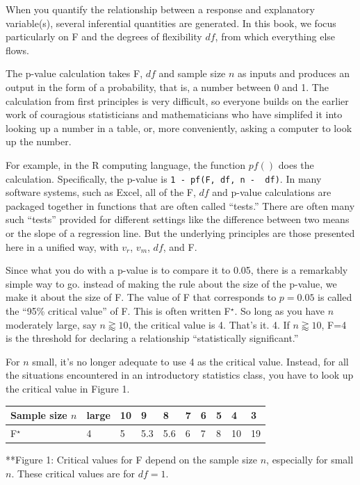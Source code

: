 \documentclass[]{tufte-book}
\begin{document}
When you quantify the relationship between a response and explanatory variable(s), several inferential quantities are generated. In this book, we focus particularly on F and the degrees of flexibility \(df\), from which everything else flows.

The p-value calculation takes F, \(df\) and sample size \(n\) as inputs and produces an output in the form of a probability, that is, a number between 0 and 1. The calculation from first principles is very difficult, so everyone builds on the earlier work of couragious statisticians and mathematicians who have simplifed it into looking up a number in a table, or, more conveniently, asking a computer to look up the number.

For example, in the R computing language, the function \(pf()\) does the calculation. Specifically, the p-value is \texttt{1\ -\ pf(F,\ df,\ n\ -\ \ df)}. In many software systems, such as Excel, all of the F, \(df\) and p-value calculations are packaged together in functions that are often called ``tests.'' There are often many such ``tests'' provided for different settings like the difference between two means or the slope of a regression line. But the underlying principles are those presented here in a unified way, with \(v_r\), \(v_m\), \(df\), and F.

Since what you do with a p-value is to compare it to 0.05, there is a remarkably simple way to go. instead of making the rule about the size of the p-value, we make it about the size of F. The value of F that corresponds to \(p = 0.05\) is called the ``95\% critical value'' of F. This is often written F\(^\star\). So long as you have \(n\) moderately large, say \(n \gtrapprox 10\), the critical value is 4. That's it. 4. If \(n \gtrapprox 10\), F=4 is the threshold for declaring a relationship ``statistically significant.''

For \(n\) small, it's no longer adequate to use 4 as the critical value. Instead, for all the situations encountered in an introductory statistics class, you have to look up the critical value in Figure 1.

\begin{longtable}[]{@{}llllllllll@{}}
\toprule
Sample size \(n\) & large & 10 & 9 & 8 & 7 & 6 & 5 & 4 & 3\tabularnewline
\midrule
\endhead
F\(^\star\) & 4 & 5 & 5.3 & 5.6 & 6 & 7 & 8 & 10 & 19\tabularnewline
\bottomrule
\end{longtable}

**Figure 1: Critical values for F depend on the sample size \(n\), especially for small \(n\). These critical values are for \(df=1\).
\end{document}
